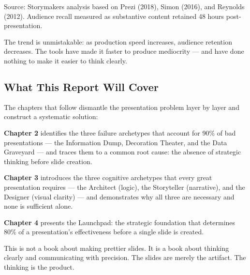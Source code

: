 \vspace{4pt}
{\small\color{slate}Source: Storymakers analysis based on Prezi (2018), Simon (2016), and Reynolds (2012). Audience recall measured as substantive content retained 48 hours post-presentation.}
\vspace{6pt}

The trend is unmistakable: as production speed increases, audience retention decreases. The tools have made it faster to produce mediocrity --- and have done nothing to make it easier to think clearly.


\subsection{What This Report Will Cover}

The chapters that follow dismantle the presentation problem layer by layer and construct a systematic solution:

\textbf{Chapter 2} identifies the three failure archetypes that account for 90\% of bad presentations --- the Information Dump, Decoration Theater, and the Data Graveyard --- and traces them to a common root cause: the absence of strategic thinking before slide creation.

\textbf{Chapter 3} introduces the three cognitive archetypes that every great presentation requires --- the Architect (logic), the Storyteller (narrative), and the Designer (visual clarity) --- and demonstrates why all three are necessary and none is sufficient alone.

\textbf{Chapter 4} presents the Launchpad: the strategic foundation that determines 80\% of a presentation's effectiveness before a single slide is created.

This is not a book about making prettier slides. It is a book about thinking clearly and communicating with precision. The slides are merely the artifact. The thinking is the product.

\clearpage
